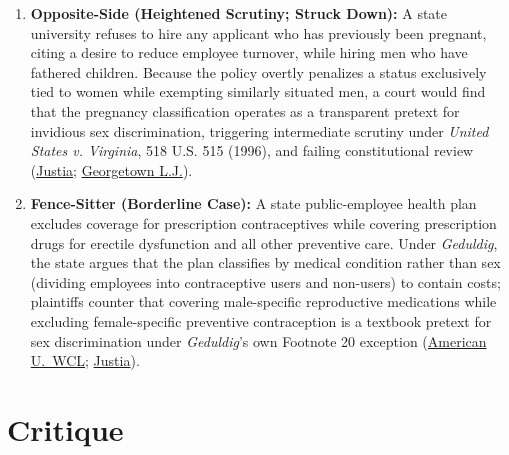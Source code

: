 \documentclass[12pt]{article}
\begin{document}
\begin{enumerate}
  \item \textbf{Opposite-Side (Heightened Scrutiny; Struck Down):} A state university refuses to hire any applicant who has previously been pregnant, citing a desire to reduce employee turnover, while hiring men who have fathered children. Because the policy overtly penalizes a status exclusively tied to women while exempting similarly situated men, a court would find that the pregnancy classification operates as a transparent pretext for invidious sex discrimination, triggering intermediate scrutiny under \textit{United States v. Virginia}, 518 U.S. 515 (1996), and failing constitutional review (\href{https://supreme.justia.com/cases/federal/us/417/484/}{Justia}; \href{https://www.law.georgetown.edu/georgetown-law-journal/wp-content/uploads/sites/26/2020/07/The-Pregnant-Citizen-from-Suffrage-to-the-Present.pdf}{Georgetown L.J.}).
  \item \textbf{Fence-Sitter (Borderline Case):} A state public-employee health plan excludes coverage for prescription contraceptives while covering prescription drugs for erectile dysfunction and all other preventive care. Under \textit{Geduldig}, the state argues that the plan classifies by medical condition rather than sex (dividing employees into contraceptive users and non-users) to contain costs; plaintiffs counter that covering male-specific reproductive medications while excluding female-specific preventive contraception is a textbook pretext for sex discrimination under \textit{Geduldig}'s own Footnote 20 exception (\href{https://digitalcommons.wcl.american.edu/cgi/viewcontent.cgi?article=1409&context=facsch_bk_contributions}{American U.\ WCL}; \href{https://supreme.justia.com/cases/federal/us/417/484/}{Justia}).
\end{enumerate}

\section{Critique}
\end{document}
